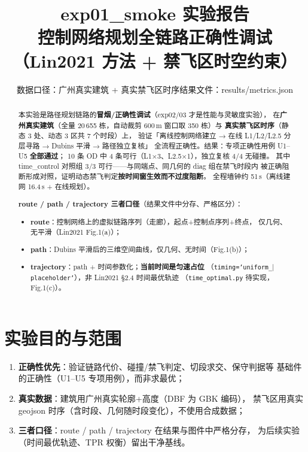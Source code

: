 \documentclass[a4paper,11pt]{article}
\title{\textbf{exp01\_smoke 实验报告}\\[6pt]
\large 控制网络规划全链路正确性调试（Lin2021 方法 + 禁飞区时空约束）}
\author{}
\date{数据口径：广州真实建筑 + 真实禁飞区时序\quad 结果文件：results/metrics.json}
\begin{document}
\maketitle

\begin{abstract}
\noindent
本实验是路径规划链路的\textbf{冒烟/正确性调试}（exp02/03 才是性能与灵敏度实验），
在\textbf{广州真实建筑}（全量 20\,655 栋，自动裁剪 600\,m 窗口取 350 栋）与
\textbf{真实禁飞区时序}（静态 3 处、动态 3 区共 7 个时段）上，
验证「离线控制网络建立 → 在线 L1/L2/L2.5 分层寻路 → Dubins 平滑 → 路径独立复核」
全流程正确性。结果：专项正确性用例 U1--U5 \textbf{全部通过}；
10 条 OD 中 4 条可行（L1×3、L2.5×1），独立复核 4/4 无碰撞。
其中 time\_control 对照组 3/3 可行——与同端点、同几何的 diag 组在禁飞时段内
被正确阻断形成对照，证明动态禁飞判定\textbf{按时间窗生效而不过度阻断}。
全程墙钟约 51\,s（离线建网 16.4\,s + 在线规划）。

\medskip
\noindent\textbf{route / path / trajectory 三者口径}（结果文件中分存、严格区分）：
\begin{itemize}
  \item \textbf{route}：控制网络上的虚拟链路序列（走廊），起点+控制点序列+终点，
        仅几何、无平滑（Lin2021 Fig.1(a)）；
  \item \textbf{path}：Dubins 平滑后的三维空间曲线，仅几何、无时间（Fig.1(b)）；
  \item \textbf{trajectory}：path + 时间参数化；\textbf{当前时间是匀速占位}
        （\texttt{timing='uniform\_$|$placeholder'}），非 Lin2021 §2.4 时间最优轨迹
        （\texttt{time\_optimal.py} 待实现，Fig.1(c)）。
\end{itemize}
\end{abstract}

\section{实验目的与范围}

\begin{enumerate}
  \item \textbf{正确性优先}：验证链路代价、碰撞/禁飞判定、切段求交、保守判据等
        基础件的正确性（U1--U5 专项用例），而非求最优；
  \item \textbf{真实数据}：建筑用广州真实轮廓+高度（DBF 为 GBK 编码），
        禁飞区用真实 geojson 时序（含时段、几何随时段变化），不使用合成数据；
  \item \textbf{三者口径}：route / path / trajectory 在结果与图件中严格分存，
        为后续实验（时间最优轨迹、TPR 权衡）留出干净基线。
\end{enumerate}
\end{document}
